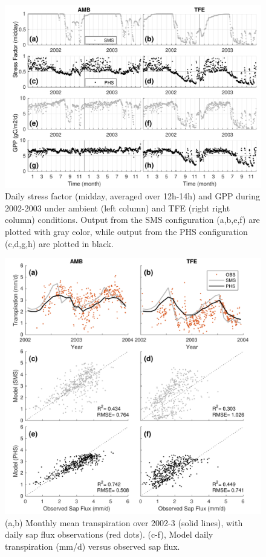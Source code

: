 \documentclass[draft,linenumbers]{agujournal}
\begin{document}
          \clearpage   
  \begin{figure}[h]
     \centering
     \includegraphics[width=30pc]{../figs3/gpp.pdf}
     \caption{Daily stress factor (midday, averaged over 12h-14h) and GPP during 2002-2003 under ambient (left column) and TFE (right right column) conditions.
     Output from the SMS configuration (a,b,e,f) are plotted with gray color, while output from the PHS configuration (c,d,g,h) are plotted in black.
     }
     \label{fig:gpp}
  \end{figure} 
         
  \clearpage   
  \begin{figure}[h]
     \centering
     \includegraphics[width=30pc]{../figs3/T.pdf}
     \caption{(a,b) Monthly mean transpiration over 2002-3 (solid lines), with daily sap flux observations (red dots).
     (c-f), Model daily transpiration (mm/d) versus observed sap flux.
     }
     \label{fig:t}
  \end{figure}
\end{document}
